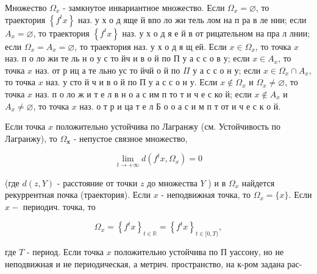 \documentclass[10pt]{article}
\begin{document}
Множество $\Omega_{x}$ - замкнутое инвариантное множество. Если $\Omega_{x}=\varnothing$, то траектория $\left\{f^{t} x\right\}$ наз. у х о д яще й впо ло жи тель лом на п ра в ле нии; если $A_{x}=\varnothing$, то траектория $\left\{f^{t} x\right\}$ наз. у х о д я $е$ й в от рицательном на пра л лнии; если $\Omega_{x}=A_{x}=\varnothing$, то траектория наз. у х о д я щ ей. Если $x \in \Omega_{x}$, то точка $x$ наз. п о ло жи те ль н о у с то йч и в о й по П у а с с о в у; если $x \in A_{x}$, то точка $x$ наз. от р иц а те льно ус то йчй о й по $\Pi$ у а с с о н у; если $x \in \Omega_{x} \cap A_{x}$, то точка $x$ наз. у сто й ч и в о й по П у а с с о н у. Если $x \notin \Omega_{x}$ и $\Omega_{x} \neq \varnothing$, то точка $x$ наз. п о ло ж и т е л в н о а с им п то т и ч е с ко й; если $x \notin A_{x}$ и $A_{x} \neq \varnothing$, то точка $x$ наз. о т р и ца т е л Б о о а с и м п т от и ч е с к о й.



Если точка $x$ положительно устойчива по Лагранжу (см. Устойчивость по Лагранжу), то $\Omega_{\boldsymbol{x}}$ - непустое связное множество,



\[

\lim _{t \rightarrow+\infty} d\left(f^{t} x, \Omega_{x}\right)=0

\]



(где $d(z, Y)$ - расстояние от точки $z$ до множества $Y$ ) и в $\Omega_{x}$ найдется рекуррентная почка (траектория). Если $x$ - неподвижная точка, то $\Omega_{x}=\{x\}$. Если $x-$ периодич. точка, то



\[

\Omega_{x}=\left\{f^{t} x\right\}_{t \in \mathbb{R}}=\left\{f^{t} x\right\}_{t \in[0, T)},

\]



где $T$ - период. Если точка $x$ положительно устойчива по П уассону, но не неподвижная и не периодическая, а метрич. пространство, на к-ром задана рас-
\end{document}
